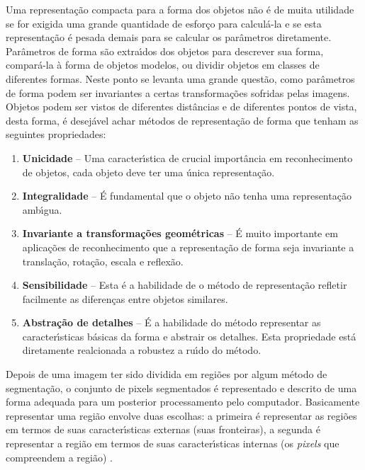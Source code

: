 Uma representa\c{c}\~{a}o compacta para a forma dos objetos n\~{a}o \'{e} de muita utilidade se for exigida uma grande quantidade de esfor\c{c}o para 
calcul\'{a}-la e se esta representa\c{c}\~{a}o \'{e} pesada demais para se calcular os par\^{a}metros diretamente. Par\^{a}metros de forma s\~{a}o extra\'{\i}dos 
dos objetos para descrever sua forma, compar\'{a}-la \`{a} forma de objetos modelos, ou dividir objetos em classes de diferentes formas. 
Neste ponto se levanta uma grande quest\~{a}o, como par\^{a}metros de forma podem ser invariantes a certas transforma\c{c}\~{o}es sofridas pelas 
imagens. Objetos podem ser vistos de diferentes dist\^{a}ncias e de diferentes pontos de vista, desta forma, \'{e} desej\'{a}vel achar m\'{e}todos 
de representa\c{c}\~{a}o de forma que tenham as seguintes propriedades\cite{JAHNE:2005}\cite{PITAS:2000}: \\

\begin{enumerate}
    \item \textbf{Unicidade} -- Uma caracter\'{\i}stica de crucial import\^{a}ncia em reconhecimento de objetos, cada objeto deve ter 
        uma \'{u}nica representa\c{c}\~{a}o.
    \item \textbf{Integralidade} -- \'{E} fundamental que o objeto n\~{a}o tenha uma representa\c{c}\~{a}o amb\'{\i}gua.
    \item \textbf{Invariante a transforma\c{c}\~{o}es geom\'{e}tricas} -- \'{E} muito importante em aplica\c{c}\~{o}es de reconhecimento que a 
        representa\c{c}\~{a}o de forma seja invariante a transla\c{c}\~{a}o, rota\c{c}\~{a}o, escala e reflex\~{a}o.
    \item \textbf{Sensibilidade} -- Esta \'{e} a habilidade de o m\'{e}todo de representa\c{c}\~{a}o refletir facilmente as diferen\c{c}as entre 
        objetos similares.
    \item \textbf{Abstra\c{c}\~{a}o de detalhes} -- \'{E} a habilidade do m\'{e}todo representar as caracter\'{\i}sticas b\'{a}sicas da forma e 
        abstrair os detalhes. Esta propriedade est\'{a} diretamente realcionada a robustez a ru\'{\i}do do m\'{e}todo.
\end{enumerate}

Depois de uma imagem ter sido dividida em regi\~{o}es por algum m\'{e}todo de segmenta\c{c}\~{a}o, o conjunto de pixels segmentados \'{e} representado 
e descrito de uma forma adequada para um posterior processamento pelo computador. Basicamente representar uma regi\~{a}o envolve duas 
escolhas: a primeira \'{e} representar as regi\~{o}es em termos de suas caracter\'{\i}sticas externas (suas fronteiras), a segunda \'{e} 
representar a regi\~{a}o em termos de suas caracter\'{\i}sticas internas (os \emph{pixels} que compreendem a regi\~{a}o) \cite{GONZALEZ:2008}.

